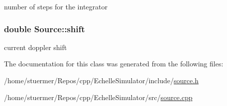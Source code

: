 number of steps for the integrator 

\subsubsection[{\texorpdfstring{shift}{shift}}]{\setlength{\rightskip}{0pt plus 5cm}double Source\+::shift\hspace{0.3cm}{\ttfamily [private]}}\hypertarget{class_source_a33104a788577b65918c95d240110c082}{}\label{class_source_a33104a788577b65918c95d240110c082}


current doppler shift 



The documentation for this class was generated from the following files\+:\begin{DoxyCompactItemize}
\item 
/home/stuermer/\+Repos/cpp/\+Echelle\+Simulator/include/\hyperlink{source_8h}{source.\+h}\item 
/home/stuermer/\+Repos/cpp/\+Echelle\+Simulator/src/\hyperlink{source_8cpp}{source.\+cpp}\end{DoxyCompactItemize}
